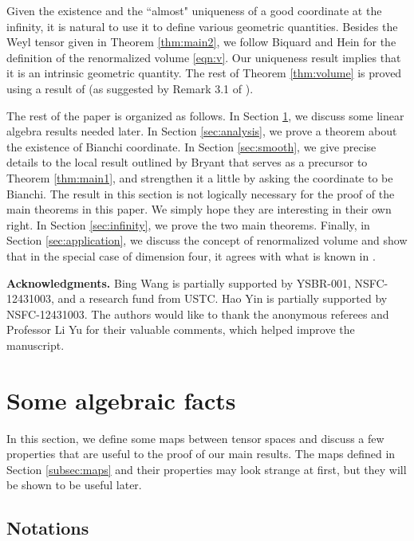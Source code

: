 \documentclass{amsart}
\numberwithin{equation}{section}
\begin{document}
Given the existence and the ``almost" uniqueness of a good coordinate at the infinity, it is natural to use it to define various geometric quantities. Besides the Weyl tensor given in Theorem \ref{thm:main2}, we follow Biquard and Hein \cite{biquard2023renormalized} for the definition of the renormalized volume \eqref{eqn:v}. Our uniqueness result implies that it is an intrinsic geometric quantity. The rest of Theorem \ref{thm:volume} is proved using a result of \cite{ros1987} (as suggested by Remark 3.1 of \cite{biquard2023renormalized}).


The rest of the paper is organized as follows. In Section \ref{sec:alg}, we discuss some linear algebra results needed later. In Section \ref{sec:analysis}, we prove a theorem about the existence of Bianchi coordinate. In Section \ref{sec:smooth}, we give precise details to the local result outlined by Bryant that serves as a precursor to Theorem \ref{thm:main1}, and strengthen it a little by asking the coordinate to be Bianchi. The result in this section is not logically necessary for the proof of the main theorems in this paper. We simply hope they are interesting in their own right. In Section \ref{sec:infinity}, we prove the two main theorems. Finally, in Section \ref{sec:application}, we discuss the concept of renormalized volume and show that in the special case of dimension four, it agrees with what is known in \cite{biquard2023renormalized}.


{\bf Acknowledgments.} Bing Wang is partially supported by YSBR-001, NSFC-12431003, and a research fund from USTC. Hao Yin is partially supported by NSFC-12431003. The authors would like to thank the anonymous referees and Professor Li Yu for their valuable comments, which helped improve the manuscript.



\section{Some algebraic facts}
\label{sec:alg}

In this section, we define some maps between tensor spaces and discuss a few properties that are useful to the proof of our main results. The maps defined in Section \ref{subsec:maps} and their properties may look strange at first, but they will be shown to be useful later.

\subsection{Notations}
\end{document}
